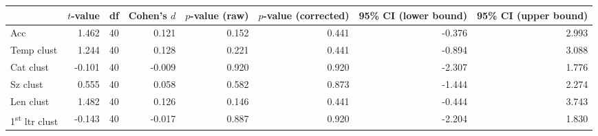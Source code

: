 \begin{tabular}{lrrrrrrr}
\toprule
{} & $t$-value & df & Cohen's $d$ & $p$-value (raw) & $p$-value (corrected) & 95\% CI (lower bound) & 95\% CI (upper bound) \\
\midrule
Acc                             &     1.462 & 40 &       0.121 &           0.152 &                 0.441 &                -0.376 &                 2.993 \\
Temp clust                      &     1.244 & 40 &       0.128 &           0.221 &                 0.441 &                -0.894 &                 3.088 \\
Cat clust                       &    -0.101 & 40 &      -0.009 &           0.920 &                 0.920 &                -2.307 &                 1.776 \\
Sz clust                        &     0.555 & 40 &       0.058 &           0.582 &                 0.873 &                -1.444 &                 2.274 \\
Len clust                       &     1.482 & 40 &       0.126 &           0.146 &                 0.441 &                -0.444 &                 3.743 \\
1\textsuperscript{st} ltr clust &    -0.143 & 40 &      -0.017 &           0.887 &                 0.920 &                -2.204 &                 1.830 \\
\bottomrule
\end{tabular}
